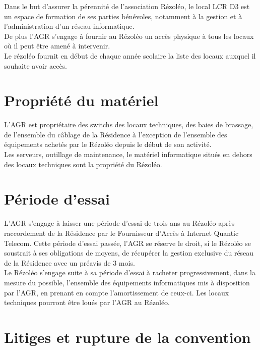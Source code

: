 \documentclass[12pt]{constitution}
\begin{document}
    Dans le but d'assurer la pérennité de l'association Rézoléo, le local LCR D3 est un espace de formation de ses parties bénévoles, notamment à la gestion et à l'administration d'un réseau informatique.\\

    De plus l'AGR s'engage à fournir au Rézoléo un accès physique à tous les locaux où il peut être amené à intervenir.\\

    Le rézoléo fournit en début de chaque année scolaire la liste des locaux auxquel il souhaite avoir accès.\\
    
\section{Propriété du matériel}

    L'AGR est propriétaire des switchs des locaux techniques, des baies de brassage, de l'ensemble du câblage de la Résidence à l'exception de l'ensemble des équipements achetés par le Rézoléo depuis le début de son activité.\\

    Les serveurs, outillage de maintenance, le matériel informatique situés en dehors des locaux techniques sont la propriété du Rézoléo.


\section{Période d'essai}

    L'AGR s'engage à laisser une période d'essai de trois ans au Rézoléo après raccordement de la Résidence par le Fournisseur d'Accès à Internet Quantic Telecom. Cette période d'essai passée, l'AGR se réserve le droit, si le Rézoléo se soustrait à ses obligations de moyens, de récupérer la gestion exclusive du réseau de la Résidence avec un préavis de 3 mois.\\

    Le Rézoléo s'engage suite à sa période d'essai à racheter progressivement, dans la mesure du possible, l'ensemble des équipements informatiques mis à disposition par l'AGR, en prenant en compte l'amortissement de ceux-ci. Les locaux techniques pourront être loués par l'AGR au Rézoléo.\\


\section{Litiges et rupture de la convention}
\end{document}
